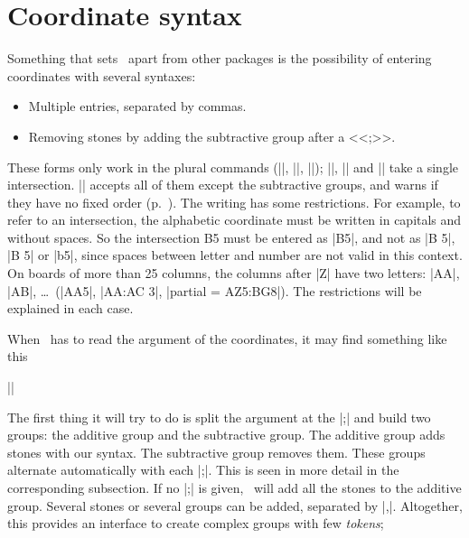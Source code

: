\section{Coordinate syntax}
\label{subsec:sintaxis-de-coordenadas}

Something that sets \pgfgoname\ apart from other packages is the possibility of entering coordinates with several syntaxes:
\begin{itemize}
	\item Multiple entries, separated by commas.
	\item Removing stones by adding the subtractive group after a <<;>>.
\end{itemize}

These forms only work in the plural commands (|\stones|, |\marks|, |\prisoners|); |\stone|, |\mark| and |\prisoner| take a single intersection. |\moves| accepts all of them except the subtractive groups, and warns if they have no fixed order (p.~\pageref{subsec:orden-coordenadas}). The writing has some restrictions. For example, to refer to an intersection, the alphabetic coordinate must be written in capitals and without spaces. So the intersection B5 must be entered as |B5|, and not as |B 5|, |B  5| or |b5|, since spaces between letter and number are not valid in this context. On boards of more than 25 columns, the columns after |Z| have two letters: |AA|, |AB|, \dots\ (|AA5|, |AA:AC 3|, |partial = AZ5:BG8|). The restrictions will be explained in each case.


When \pgfgoname\ has to read the argument of the coordinates, it may find something like this
\begin{center}
	||
\end{center}

The first thing it will try to do is split the argument at the |;| and build two groups: the additive group and the subtractive group. The additive group adds stones with our syntax. The subtractive group removes them. These groups alternate automatically with each |;|. This is seen in more detail in the corresponding subsection. If no |;| is given, \pgfgoname\ will add all the stones to the additive group. Several stones or several groups can be added, separated by |,|. Altogether, this provides an interface to create complex groups with few \emph{tokens};

\begin{codeexample}[width=0pt]

	\begin{goban}[17, partial = A1:R5, label = {at = {north, west}}]
	\end{goban}
\end{codeexample}


